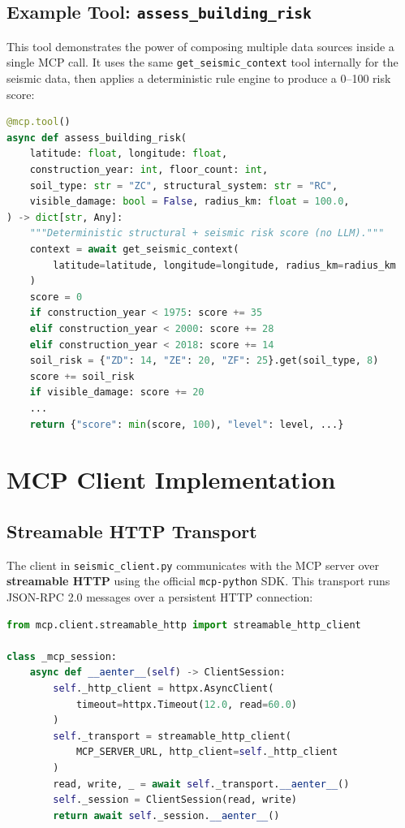 \documentclass[11pt,a4paper]{article}
\begin{document}
\subsection{Example Tool: \texttt{assess\_building\_risk}}

This tool demonstrates the power of composing multiple data sources inside a single
MCP call. It uses the same \texttt{get\_seismic\_context} tool internally for the
seismic data, then applies a deterministic rule engine to produce a 0--100 risk
score:

\begin{lstlisting}[style=codestyle, language=Python]
@mcp.tool()
async def assess_building_risk(
    latitude: float, longitude: float,
    construction_year: int, floor_count: int,
    soil_type: str = "ZC", structural_system: str = "RC",
    visible_damage: bool = False, radius_km: float = 100.0,
) -> dict[str, Any]:
    """Deterministic structural + seismic risk score (no LLM)."""
    context = await get_seismic_context(
        latitude=latitude, longitude=longitude, radius_km=radius_km
    )
    score = 0
    if construction_year < 1975: score += 35
    elif construction_year < 2000: score += 28
    elif construction_year < 2018: score += 14
    soil_risk = {"ZD": 14, "ZE": 20, "ZF": 25}.get(soil_type, 8)
    score += soil_risk
    if visible_damage: score += 20
    ...
    return {"score": min(score, 100), "level": level, ...}
\end{lstlisting}

\section{MCP Client Implementation}

\subsection{Streamable HTTP Transport}

The client in \texttt{seismic\_client.py} communicates with the MCP server over
\textbf{streamable HTTP} using the official \texttt{mcp-python} SDK. This transport
runs JSON-RPC 2.0 messages over a persistent HTTP connection:

\begin{lstlisting}[style=codestyle, language=Python]
from mcp.client.streamable_http import streamable_http_client

class _mcp_session:
    async def __aenter__(self) -> ClientSession:
        self._http_client = httpx.AsyncClient(
            timeout=httpx.Timeout(12.0, read=60.0)
        )
        self._transport = streamable_http_client(
            MCP_SERVER_URL, http_client=self._http_client
        )
        read, write, _ = await self._transport.__aenter__()
        self._session = ClientSession(read, write)
        return await self._session.__aenter__()
\end{lstlisting}
\end{document}
